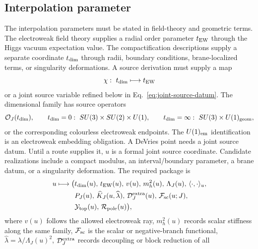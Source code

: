 \subsection{Interpolation parameter}
\label{app:interpolation-parameter}

The interpolation parameters must be stated in field-theory and geometric
terms.  The electroweak field theory supplies a radial order parameter
\(t_{\rm EW}\) through the Higgs vacuum expectation value.  The
compactification descriptions supply a separate coordinate \(t_{\rm dim}\)
through radii, boundary conditions, brane-localized terms, or singularity
deformations.  A source derivation must supply a map
\begin{equation}
  \chi:\ t_{\rm dim}\longmapsto t_{\rm EW}
  \label{eq:dimensional-ray-map}
\end{equation}
or a joint source variable refined below in Eq.~\eqref{eq:joint-source-datum}.  The
dimensional family has source operators
\begin{equation}
  \mathcal O_J(t_{\rm dim}),
  \qquad
  t_{\rm dim}=0:\ SU(3)\times SU(2)\times U(1),
  \qquad
  t_{\rm dim}=\infty:\ SU(3)\times U(1)_{\rm geom},
  \label{eq:dimensional-interpolation-family}
\end{equation}
or the corresponding colourless electroweak endpoints.  The
\(U(1)_{\rm em}\) identification is an electroweak embedding obligation.  A
DeVries point needs a joint source datum.  Until a route supplies it, \(u\) is
a formal joint source coordinate.  Candidate realizations include a compact
modulus, an interval/boundary parameter, a brane datum, or a singularity
deformation.  The required package is
\begin{equation}
  \begin{aligned}
  u\longmapsto\big(&
  t_{\rm dim}(u),\,t_{\rm EW}(u),\,v(u),\,m_h^2(u),\,
  \Lambda_J(u),\,\langle\cdot,\cdot\rangle_u,\\
  &P_J(u),\,\widehat K_J(u,\widehat\lambda),\,
  \mathcal D_J^{\rm extra}(u),\,\mathcal F_{\rm sc}(u;J),\\
  &\mathcal Y_{\rm top}(u),\,\mathcal R_{\rm pole}(u)\big),
  \end{aligned}
  \label{eq:joint-source-datum}
\end{equation}
where \(v(u)\) follows the allowed electroweak ray, \(m_h^2(u)\) records scalar
stiffness along the same family, \(\mathcal F_{\rm sc}\) is the scalar or
negative-branch functional, \(\widehat\lambda=\lambda/\Lambda_J(u)^2\),
\(\mathcal D_J^{\rm extra}\) records decoupling or block reduction of all
